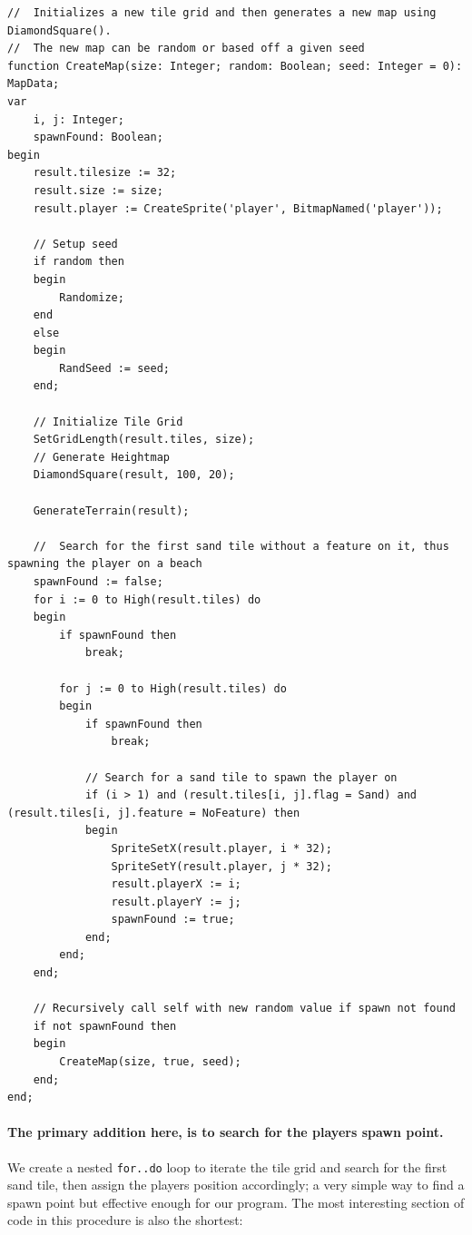 \documentclass{article}
\begin{document}
\begin{adjustwidth}{-1.5cm}{-1.5cm}
\begin{mdframed}[backgroundcolor=darkgray]
\begin{verbatim}
//	Initializes a new tile grid and then generates a new map using DiamondSquare().
//	The new map can be random or based off a given seed
function CreateMap(size: Integer; random: Boolean; seed: Integer = 0): MapData;
var
	i, j: Integer;
	spawnFound: Boolean;
begin
	result.tilesize := 32;
	result.size := size;
	result.player := CreateSprite('player', BitmapNamed('player'));

	// Setup seed
	if random then
	begin
		Randomize;
	end
	else
	begin
		RandSeed := seed;
	end;

	// Initialize Tile Grid
	SetGridLength(result.tiles, size);
	// Generate Heightmap
	DiamondSquare(result, 100, 20);

	GenerateTerrain(result);

	//	Search for the first sand tile without a feature on it, thus spawning the player on a beach
	spawnFound := false;
	for i := 0 to High(result.tiles) do
	begin
		if spawnFound then
			break;

		for j := 0 to High(result.tiles) do
		begin
			if spawnFound then
				break;

			// Search for a sand tile to spawn the player on
			if (i > 1) and (result.tiles[i, j].flag = Sand) and (result.tiles[i, j].feature = NoFeature) then
			begin
				SpriteSetX(result.player, i * 32);
				SpriteSetY(result.player, j * 32);
				result.playerX := i;
				result.playerY := j;
				spawnFound := true;
			end;
		end;
	end;

	// Recursively call self with new random value if spawn not found
	if not spawnFound then
	begin
		CreateMap(size, true, seed);
	end;
end;
\end{verbatim}
\end{mdframed}
\end{adjustwidth}

\paragraph{The primary addition here, is to search for the players spawn point.} We create a nested \texttt{for..do} loop to iterate the tile grid and search for the first sand tile, then assign the players position accordingly; a very simple way to find a spawn point but effective enough for our program. The most interesting section of code in this procedure is also the shortest:
\end{document}
